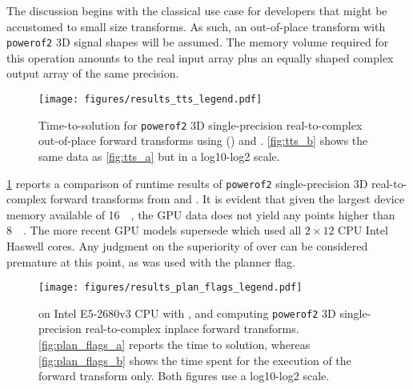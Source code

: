 The discussion begins with the classical use case for developers that might be accustomed to small size transforms. As such, an out-of-place transform with \texttt{powerof2} 3D signal shapes will be assumed. The memory volume required for this operation amounts to the real input array plus an equally shaped complex output array of the same precision.

\begin{figure}[!htbp]
  \centering
  \texttt{[image: figures/results\_tts\_legend.pdf]}\vspace{-1em}
  \hfill
  \caption{Time-to-solution for \texttt{powerof2} 3D single-precision real-to-complex out-of-place forward transforms using \fftw{} () and \cufft{}. \cref{fig:tts_b} shows the same data as \cref{fig:tts_a} but in a log10-log2 scale.}
  \label{fig:tts}
\end{figure}

\cref{fig:tts} reports a comparison of runtime results of \texttt{powerof2} single-precision 3D real-to-complex forward transforms from \fftw{} and \cufft{}. It is evident that given the largest device memory available of  \SI{16}{\gibi\byte}, the GPU data does not yield any points higher than \SI{8}{\gibi\byte}. The more recent GPU models supersede \fftw{} which used all $2{\times}12$ CPU Intel Haswell cores. Any judgment on the superiority of \cufft{} over \fftw{} can be considered premature at this point, as \fftw{} was used with the  planner flag.

\begin{figure}[!htbp]
  \centering
  \texttt{[image: figures/results\_plan\_flags\_legend.pdf]}\vspace{-1em}
  \hfill
  \caption{\fftw{} on Intel E5-2680v3 CPU with ,  and  computing \texttt{powerof2} 3D single-precision real-to-complex inplace forward transforms. \cref{fig:plan_flags_a} reports the time to solution, whereas \cref{fig:plan_flags_b} shows the time spent for the execution of the forward transform only. Both figures use a log10-log2 scale.}
  \label{fig:fftw_plan_flags}
\end{figure}

